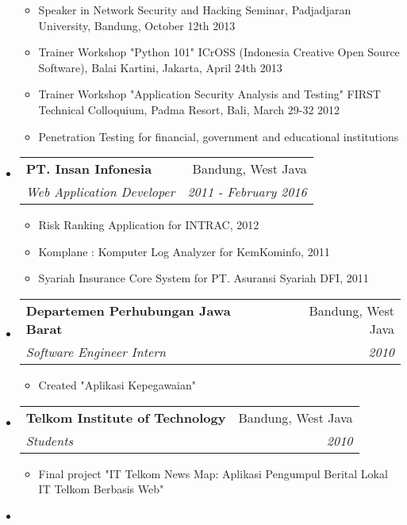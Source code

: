 \documentclass[letterpaper,11pt]{article}
\makeatletter
\newcommand{\resitem}[1]{\item #1 \vspace{-2pt}}
\newcommand{\ressubheading}[4]{
\begin{tabular*}{6.5in}{l@{\cftdotfill{\cftsecdotsep}\extracolsep{\fill}}r}
		\textbf{#1} & #2 \\
		\textit{#3} & \textit{#4} \\
\end{tabular*}\vspace{-6pt}}
\makeatother
\begin{document}
\begin{itemize}
\begin{itemize}
		\resitem{Speaker in Network Security and Hacking Seminar, Padjadjaran University, Bandung, October 12th 2013}

		\resitem{Trainer Workshop "Python 101" ICrOSS (Indonesia Creative Open Source Software), Balai Kartini, Jakarta, April 24th 2013}

		\resitem{Trainer Workshop "Application Security Analysis and Testing" FIRST Technical Colloquium, Padma Resort, Bali, March 29-32 2012}

		\resitem{Penetration Testing for financial, government and educational institutions}

	\end{itemize}

\item

	\ressubheading{PT. Insan Infonesia}{Bandung, West Java}{Web Application Developer}{2011 - February 2016}

	\begin{itemize}

    \resitem{Risk Ranking Application for INTRAC, 2012}

    \resitem{Komplane : Komputer Log Analyzer for KemKominfo, 2011}

		\resitem{Syariah Insurance Core System for PT. Asuransi Syariah DFI, 2011}

	\end{itemize}

\item

	\ressubheading{Departemen Perhubungan Jawa Barat}{Bandung, West Java}{Software Engineer Intern}{2010}

	\begin{itemize}

		\resitem{Created "Aplikasi Kepegawaian"}

	\end{itemize}

\item

	\ressubheading{Telkom Institute of Technology}{Bandung, West Java}{Students}{2010}

	\begin{itemize}

		\resitem{Final project "IT Telkom News Map: Aplikasi Pengumpul Berital Lokal IT Telkom Berbasis Web"}

	\end{itemize}

\item


\end{itemize}
\end{document}

